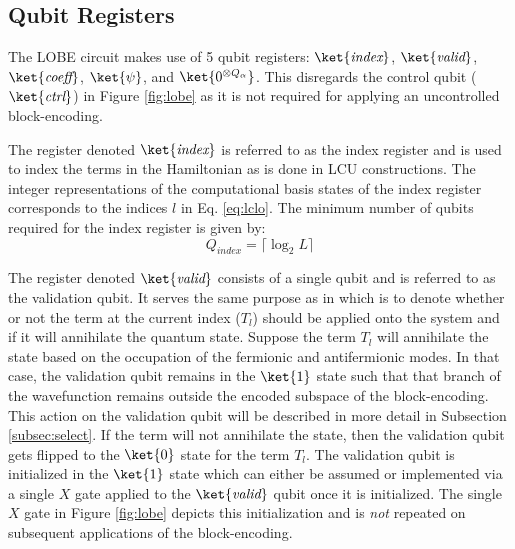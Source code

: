 \subsection{Qubit Registers}
\label{subsec:registers}

The LOBE circuit makes use of 5 qubit registers: $\ket{\textit{index}}$, $\ket{\textit{valid}}$, $\ket{\textit{coeff}}$, $\ket{\psi}$, and $\ket{0^{\otimes Q_\alpha}}$.
This disregards the control qubit ($\ket{\textit{ctrl}}$) in Figure \ref{fig:lobe} as it is not required for applying an uncontrolled block-encoding.

The register denoted $\ket{\textit{index}}$ is referred to as the index register and is used to index the terms in the Hamiltonian as is done in LCU constructions. 
The integer representations of the computational basis states of the index register corresponds to the indices $l$ in Eq. \ref{eq:lclo}. 
The minimum number of qubits required for the index register is given by:
\begin{equation}
    Q_{\textit{index}} = \lceil \log_2{L} \rceil
\end{equation}

The register denoted $\ket{\textit{valid}}$ consists of a single qubit and is referred to as the validation qubit.
It serves the same purpose as in \cite{liu2024efficient} which is to denote whether or not the term at the current index ($T_l$) should be applied onto the system and if it will annihilate the quantum state.
Suppose the term $T_l$ will annihilate the state based on the occupation of the fermionic and antifermionic modes. 
In that case, the validation qubit remains in the $\ket{1}$ state such that that branch of the wavefunction remains outside the encoded subspace of the block-encoding.
This action on the validation qubit will be described in more detail in Subsection \ref{subsec:select}.
If the term will not annihilate the state, then the validation qubit gets flipped to the $\ket{0}$ state for the term $T_l$.
The validation qubit is initialized in the $\ket{1}$ state which can either be assumed or implemented via a single $X$ gate applied to the $\ket{\textit{valid}}$ qubit once it is initialized.
The single $X$ gate in Figure \ref{fig:lobe} depicts this initialization and is \textit{not} repeated on subsequent applications of the block-encoding.

